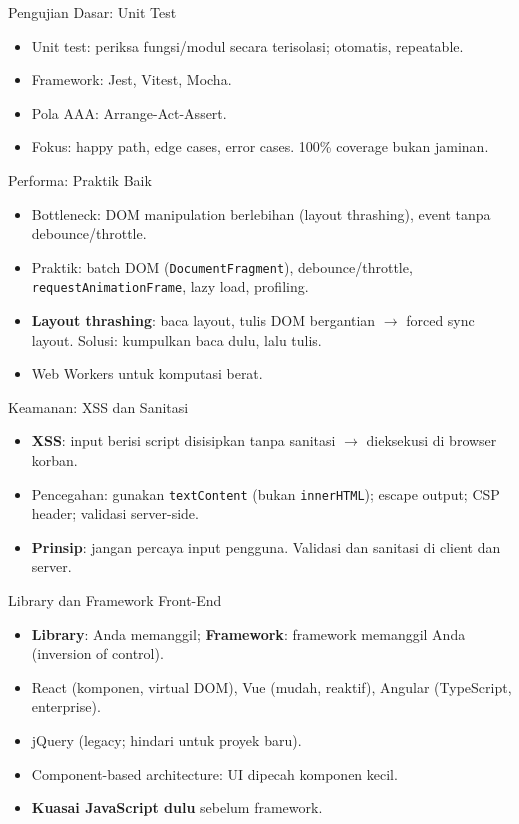 \documentclass[handout]{beamer}
\begin{document}
\begin{frame}{Pengujian Dasar: Unit Test}
	\begin{itemize}
		\item Unit test: periksa fungsi/modul secara terisolasi; otomatis, repeatable.
		\item Framework: Jest, Vitest, Mocha.
		\item Pola AAA: Arrange-Act-Assert.
		\item Fokus: happy path, edge cases, error cases. 100\% coverage bukan jaminan.
	\end{itemize}
\end{frame}

\begin{frame}{Performa: Praktik Baik}
	\begin{itemize}
		\item Bottleneck: DOM manipulation berlebihan (layout thrashing), event tanpa debounce/throttle.
		\item Praktik: batch DOM (\texttt{DocumentFragment}), debounce/throttle, \texttt{requestAnimationFrame}, lazy load, profiling.
		\item \textbf{Layout thrashing}: baca layout, tulis DOM bergantian $\to$ forced sync layout. Solusi: kumpulkan baca dulu, lalu tulis.
		\item Web Workers untuk komputasi berat.
	\end{itemize}
\end{frame}

\begin{frame}{Keamanan: XSS dan Sanitasi}
	\begin{itemize}
		\item \textbf{XSS}: input berisi script disisipkan tanpa sanitasi $\to$ dieksekusi di browser korban.
		\item Pencegahan: gunakan \texttt{textContent} (bukan \texttt{innerHTML}); escape output; CSP header; validasi server-side.
		\item \textbf{Prinsip}: jangan percaya input pengguna. Validasi dan sanitasi di client dan server.
	\end{itemize}
\end{frame}

\begin{frame}{Library dan Framework Front-End}
	\begin{itemize}
		\item \textbf{Library}: Anda memanggil; \textbf{Framework}: framework memanggil Anda (inversion of control).
		\item React (komponen, virtual DOM), Vue (mudah, reaktif), Angular (TypeScript, enterprise).
		\item jQuery (legacy; hindari untuk proyek baru).
		\item Component-based architecture: UI dipecah komponen kecil.
		\item \textbf{Kuasai JavaScript dulu} sebelum framework.
	\end{itemize}
\end{frame}
\end{document}
